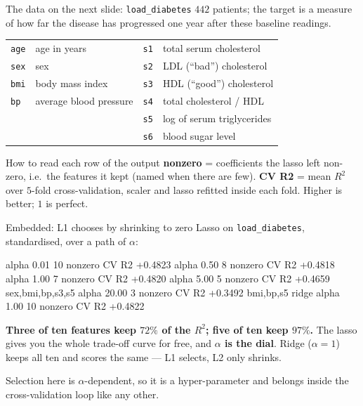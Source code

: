 \documentclass[aspectratio=169]{beamer}
\begin{document}
\begin{frame}[shrink=8]{The data on the next slide: \texttt{load\_diabetes}}
  \small $442$ patients; the target is a measure of how far the disease has
  progressed one year after these baseline readings.
  \begin{center}\small
  \begin{tabular}{@{}ll@{\qquad}ll@{}}
    \toprule
    \texttt{age} & age in years & \texttt{s1} & total serum cholesterol\\
    \texttt{sex} & sex & \texttt{s2} & LDL (``bad'') cholesterol\\
    \texttt{bmi} & body mass index & \texttt{s3} & HDL (``good'') cholesterol\\
    \texttt{bp}  & average blood pressure & \texttt{s4} & total cholesterol / HDL\\
    & & \texttt{s5} & log of serum triglycerides\\
    & & \texttt{s6} & blood sugar level\\
    \bottomrule
  \end{tabular}
  \end{center}
  \begin{block}{How to read each row of the output}
    \small \textbf{nonzero} = coefficients the lasso left non-zero, i.e.\ the
    features it kept (named when there are few).
    \textbf{CV R2} = mean $R^2$ over $5$-fold cross-validation, scaler and
    lasso refitted inside each fold. Higher is better; $1$ is perfect.
  \end{block}
\end{frame}

\begin{frame}[fragile,shrink=6]{Embedded: L1 chooses by shrinking to zero}
Lasso on \texttt{load\_diabetes}, standardised, over a path of $\alpha$:
\begin{outblk}
   alpha  0.01  10 nonzero  CV R2 +0.4823
   alpha  0.50   8 nonzero  CV R2 +0.4818
   alpha  1.00   7 nonzero  CV R2 +0.4820
   alpha  5.00   5 nonzero  CV R2 +0.4659  sex,bmi,bp,s3,s5
   alpha 20.00   3 nonzero  CV R2 +0.3492  bmi,bp,s5
   ridge alpha 1.00  10 nonzero  CV R2 +0.4822
\end{outblk}
\begin{center}\small
  \textbf{Three of ten features keep $72\%$ of the $R^2$; five of ten keep
  $97\%$.} The lasso gives you the whole trade-off curve for free, and
  \textbf{$\alpha$ is the dial}. Ridge ($\alpha = 1$) keeps all ten and
  scores the same --- L1 selects, L2 only shrinks.
\end{center}
\begin{center}\small
  Selection here is $\alpha$-dependent, so it is a hyper-parameter and belongs
  inside the cross-validation loop like any other.
\end{center}
\end{frame}
\end{document}
